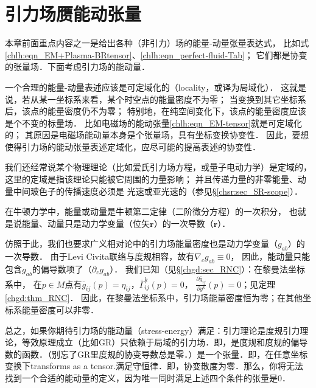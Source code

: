 



\section{引力场赝能动张量}

本章前面重点内容之一是给出各种（非引力）场的能量-动量张量表达式，
比如式\eqref{chlh:eqn_EM+Plasma-BRtensor}、\eqref{chlh:eqn_perfect-fluid-Tab}；
它们都是协变的张量场．下面考虑引力场的能动量．

一个合理的能量-动量表述应该是可定域化的（locality，或译为局域化）．
这就是说，若从某一坐标系来看，某个时空点的能量密度不为零；
当变换到其它坐标系后，该点的能量密度仍不为零；
特别地，在纯空间变化下，该点的能量密度应该是个不变的标量场．
比如电磁场的能动张量\eqref{chlh:eqn_EM-tensor}就是可定域化的；
其原因是电磁场能动量本身是个张量场，具有坐标变换协变性．
因此，要想使得引力场的能动张量表述定域化，应尽可能的提高表述的协变性．


我们还经常说某个物理理论（比如爱氏引力场方程，或量子电动力学）是定域的，
这里的定域是指该理论只能被它周围的力量影响；
并且传递力量的非零能量、动量中间玻色子的传播速度必须是
光速或亚光速的（参见\S\ref{chsr:sec_SR-scope}）．

在牛顿力学中，能量或动量是牛顿第二定律（二阶微分方程）的一次积分，
也就是说能量、动量只是动力学变量（位矢$\boldsymbol{r}$）的一次导数（$\dot{\boldsymbol{r}}$）．

仿照于此，我们也要求广义相对论中的引力场能量密度也是动力学变量（$g_{ab}$）的一次导数．
由于Levi Civita联络与度规相容，故有$\nabla_c g_{ab}\equiv 0$，
因此，能动量只能包含$g_{ab}$的偏导数项了（$\partial_c g_{ab}$）．
我们已知（见\S\ref{chgd:sec_RNC}）：在黎曼法坐标系中， 
在$p\in M$点有$\bar{g}_{ij}(p)=\eta_{ij}$，$\bar{\Gamma}_{ij}^k(p)=0$，
$\frac{\partial \bar{g}_{ij}}{\partial y^k}(p)=0$；见定理\ref{chgd:thm_RNC}．
因此，在黎曼法坐标系中，引力场能量密度恒为零；在其他坐标系能量密度可以非零．

总之，如果你期待引力场的能动量（stress-energy）满足：引力理论是度规引力理论，等效原理成立（比如GR）只依赖于局域的引力场．即，是度规和度规的偏导数的函数．（别忘了GR里度规的协变导数总是零．）是一个张量．即，在任意坐标变换下transforms as a tensor.满足守恒律．即，协变散度为零．那么，你将无法找到一个合适的能动量的定义，因为唯一同时满足上述四个条件的张量是0．



